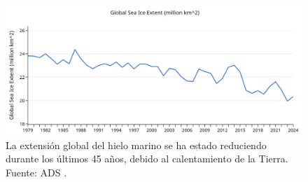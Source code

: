\documentclass[10pt,twocolumn,letterpaper]{article}
\begin{document}
\begin{figure}[t]
\begin{center}
\includegraphics[width=1\textwidth]{ice.jpg}
\end{center}
   \caption{La extensión global del hielo marino se ha estado reduciendo durante los últimos 45 años, debido al calentamiento de la Tierra. Fuente: ADS \cite{149}.}
\label{fig:24}
\end{figure}

\clearpage
\twocolumn

{\small
\renewcommand{\refname}{Referencias}


}
\end{document}
